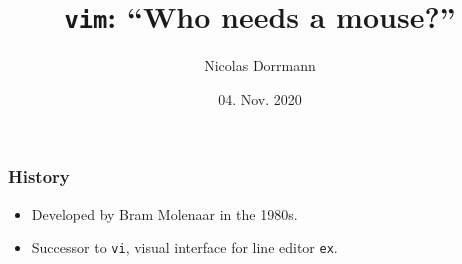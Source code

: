 \documentclass{beamer}
\title{\texttt{vim}: ``Who needs a mouse?''}
\author{Nicolas Dorrmann}
\date{04. Nov. 2020}
\begin{document}
\frame{\titlepage}

\begin{frame}
    \frametitle{History}
    \begin{itemize}
        \item Developed by Bram Molenaar in the 1980s.
        \item Successor to \texttt{vi}, visual interface for line editor \texttt{ex}.
    \end{itemize}

\end{frame}
\end{document}
